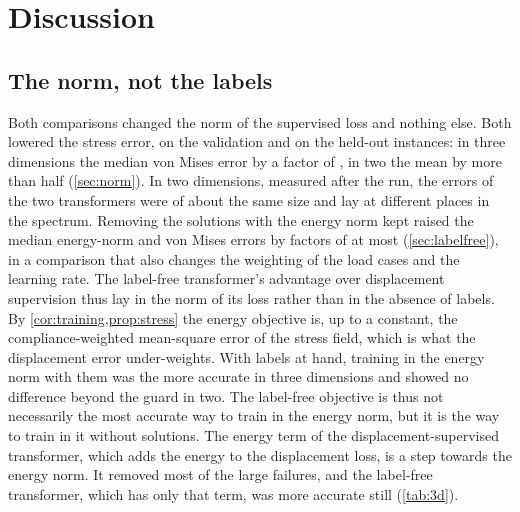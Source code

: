 \section{Discussion}\label{sec:discussion}

\subsection{The norm, not the labels}
Both comparisons changed the norm of the supervised loss and nothing else. Both lowered the
stress error, on the validation and on the held-out instances: in three dimensions the
median von Mises error by a factor of \numNlThreeNormVm{}, in two the mean by more than half
(\cref{sec:norm}). In two dimensions, measured after the run, the errors of the two
transformers were of about the same size and lay at different places in the spectrum.
Removing the solutions with the energy norm kept raised the median energy-norm and von Mises
errors by factors of at most \numNlThreeLabelWithin{} (\cref{sec:labelfree}), in a comparison
that also changes the weighting of the load cases and the learning rate. The label-free
transformer's advantage over displacement supervision thus lay in the norm of its loss rather
than in the absence of labels. By \cref{cor:training,prop:stress} the energy objective is, up
to a constant, the compliance-weighted mean-square error of the stress field, which is what
the displacement error under-weights. With labels at hand, training in the energy norm with
them was the more accurate in three dimensions and showed no difference beyond the guard in two. The label-free objective is thus not necessarily
the most accurate way to train in the
energy norm, but it is the way to train in it without solutions. The energy term of the
displacement-supervised transformer, which adds the energy to the displacement loss, is a step towards the energy norm. It removed most of the large failures, and the label-free
transformer, which has only that term, was more accurate still (\cref{tab:3d}).

